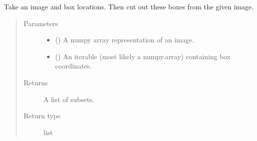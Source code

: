 \documentclass[letterpaper,10pt,english]{sphinxmanual}
\begin{document}
\begin{fulllineitems}
\label{\detokenize{api:readpyne.core.get_subsets}}
Take an image and box locations. Then cut out these boxes from the given image.
\begin{quote}\begin{description}
\item[{Parameters}] \leavevmode\begin{itemize}
\item {} 
 () \textendash{} A numpy array representation of an image.

\item {} 
 () \textendash{} An iterable (most likely a numpy.array) containing box coordinates.

\end{itemize}

\item[{Returns}] \leavevmode
A list of subsets.

\item[{Return type}] \leavevmode
list

\end{description}\end{quote}

\end{fulllineitems}

\end{document}
